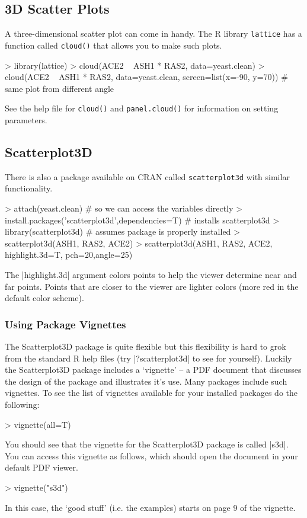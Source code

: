 \subsection{3D Scatter Plots}

A three-dimensional scatter plot can come in handy. The R library
\lstinline!lattice! has a function called \lstinline!cloud()! that
allows you to make such plots.
\begin{R}
> library(lattice)
> cloud(ACE2 ~ ASH1 * RAS2, data=yeast.clean)
> cloud(ACE2 ~ ASH1 * RAS2, data=yeast.clean, screen=list(x=-90, y=70)) # same plot from different angle
\end{R}
See the help file for \lstinline!cloud()! and \lstinline!panel.cloud()! for information on setting parameters.

\subsection{Scatterplot3D}
There is also a package available on CRAN called \lstinline!scatterplot3d! with similar functionality.
%
\begin{R}
> attach(yeast.clean) # so we can access the variables directly
> install.packages('scatterplot3d',dependencies=T) # installs scatterplot3d
> library(scatterplot3d) # assumes package is properly installed
> scatterplot3d(ASH1, RAS2, ACE2)
> scatterplot3d(ASH1, RAS2, ACE2, highlight.3d=T, pch=20,angle=25)
\end{R}
%
The |highlight.3d| argument colors points to help the viewer determine near and far points. Points that are closer to the viewer are lighter colors (more red in the default color scheme).

\subsubsection{Using Package Vignettes}
The Scatterplot3D package is quite flexible but this flexibility is hard to grok from the standard R help files (try |?scatterplot3d| to see for yourself).  Luckily the Scatterplot3D package includes a `vignette' -- a PDF document that discusses the design of the package and illustrates it's use.  Many packages include such vignettes. To see the list of vignettes available for your installed packages do the following:
%
\begin{R}
> vignette(all=T)
\end{R}
%
You should see that the vignette for the Scatterplot3D package is called |s3d|. You can access this vignette as follows, which should open the document in your default PDF viewer.
\begin{R}
> vignette("s3d")
\end{R}
%
In this case, the `good stuff' (i.e. the examples) starts on page 9 of the vignette.

